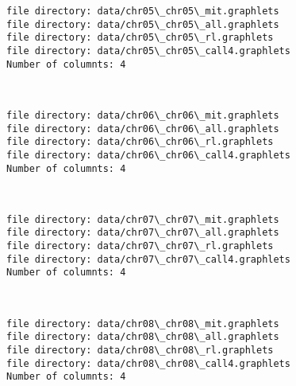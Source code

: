 \documentclass[11pt]{article}
\begin{document}
    \begin{Verbatim}[commandchars=\\\{\}]
file directory: data/chr05\_chr05\_mit.graphlets
file directory: data/chr05\_chr05\_all.graphlets
file directory: data/chr05\_chr05\_rl.graphlets
file directory: data/chr05\_chr05\_call4.graphlets
Number of columnts: 4

    \end{Verbatim}

    \begin{center}
    \end{center}
    { \hspace*{\fill} \\}
    
    \begin{Verbatim}[commandchars=\\\{\}]
file directory: data/chr06\_chr06\_mit.graphlets
file directory: data/chr06\_chr06\_all.graphlets
file directory: data/chr06\_chr06\_rl.graphlets
file directory: data/chr06\_chr06\_call4.graphlets
Number of columnts: 4

    \end{Verbatim}

    \begin{center}
    \end{center}
    { \hspace*{\fill} \\}
    
    \begin{Verbatim}[commandchars=\\\{\}]
file directory: data/chr07\_chr07\_mit.graphlets
file directory: data/chr07\_chr07\_all.graphlets
file directory: data/chr07\_chr07\_rl.graphlets
file directory: data/chr07\_chr07\_call4.graphlets
Number of columnts: 4

    \end{Verbatim}

    \begin{center}
    \end{center}
    { \hspace*{\fill} \\}
    
    \begin{Verbatim}[commandchars=\\\{\}]
file directory: data/chr08\_chr08\_mit.graphlets
file directory: data/chr08\_chr08\_all.graphlets
file directory: data/chr08\_chr08\_rl.graphlets
file directory: data/chr08\_chr08\_call4.graphlets
Number of columnts: 4

    \end{Verbatim}
\end{document}
